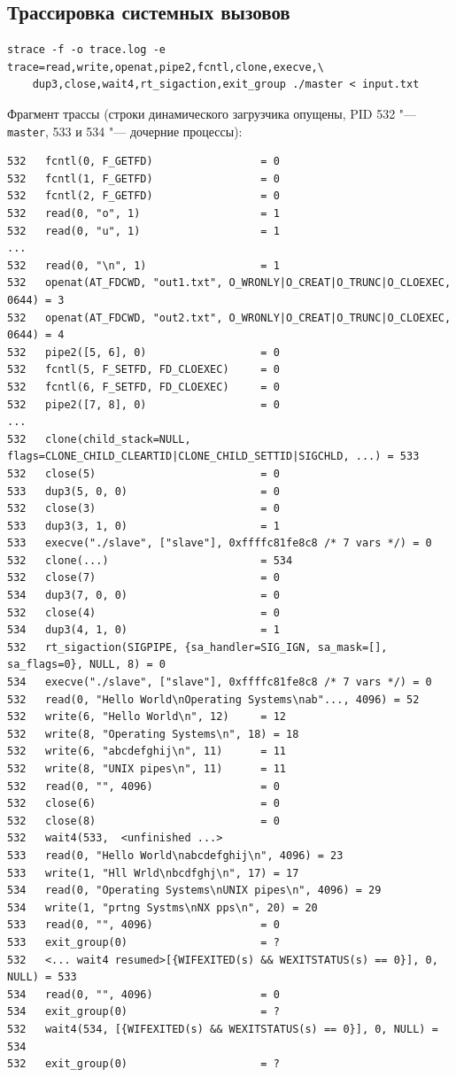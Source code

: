 \documentclass[12pt,a4paper]{article}
\begin{document}
\subsection{Трассировка системных вызовов}
\begin{lstlisting}[style=console]
strace -f -o trace.log -e trace=read,write,openat,pipe2,fcntl,clone,execve,\
    dup3,close,wait4,rt_sigaction,exit_group ./master < input.txt
\end{lstlisting}

Фрагмент трассы (строки динамического загрузчика опущены, PID 532 "---
\texttt{master}, 533 и 534 "--- дочерние процессы):

\begin{lstlisting}[style=console]
532   fcntl(0, F_GETFD)                 = 0
532   fcntl(1, F_GETFD)                 = 0
532   fcntl(2, F_GETFD)                 = 0
532   read(0, "o", 1)                   = 1
532   read(0, "u", 1)                   = 1
...
532   read(0, "\n", 1)                  = 1
532   openat(AT_FDCWD, "out1.txt", O_WRONLY|O_CREAT|O_TRUNC|O_CLOEXEC, 0644) = 3
532   openat(AT_FDCWD, "out2.txt", O_WRONLY|O_CREAT|O_TRUNC|O_CLOEXEC, 0644) = 4
532   pipe2([5, 6], 0)                  = 0
532   fcntl(5, F_SETFD, FD_CLOEXEC)     = 0
532   fcntl(6, F_SETFD, FD_CLOEXEC)     = 0
532   pipe2([7, 8], 0)                  = 0
...
532   clone(child_stack=NULL, flags=CLONE_CHILD_CLEARTID|CLONE_CHILD_SETTID|SIGCHLD, ...) = 533
532   close(5)                          = 0
533   dup3(5, 0, 0)                     = 0
532   close(3)                          = 0
533   dup3(3, 1, 0)                     = 1
533   execve("./slave", ["slave"], 0xffffc81fe8c8 /* 7 vars */) = 0
532   clone(...)                        = 534
532   close(7)                          = 0
534   dup3(7, 0, 0)                     = 0
532   close(4)                          = 0
534   dup3(4, 1, 0)                     = 1
532   rt_sigaction(SIGPIPE, {sa_handler=SIG_IGN, sa_mask=[], sa_flags=0}, NULL, 8) = 0
534   execve("./slave", ["slave"], 0xffffc81fe8c8 /* 7 vars */) = 0
532   read(0, "Hello World\nOperating Systems\nab"..., 4096) = 52
532   write(6, "Hello World\n", 12)     = 12
532   write(8, "Operating Systems\n", 18) = 18
532   write(6, "abcdefghij\n", 11)      = 11
532   write(8, "UNIX pipes\n", 11)      = 11
532   read(0, "", 4096)                 = 0
532   close(6)                          = 0
532   close(8)                          = 0
532   wait4(533,  <unfinished ...>
533   read(0, "Hello World\nabcdefghij\n", 4096) = 23
533   write(1, "Hll Wrld\nbcdfghj\n", 17) = 17
534   read(0, "Operating Systems\nUNIX pipes\n", 4096) = 29
534   write(1, "prtng Systms\nNX pps\n", 20) = 20
533   read(0, "", 4096)                 = 0
533   exit_group(0)                     = ?
532   <... wait4 resumed>[{WIFEXITED(s) && WEXITSTATUS(s) == 0}], 0, NULL) = 533
534   read(0, "", 4096)                 = 0
534   exit_group(0)                     = ?
532   wait4(534, [{WIFEXITED(s) && WEXITSTATUS(s) == 0}], 0, NULL) = 534
532   exit_group(0)                     = ?
\end{lstlisting}
\end{document}
